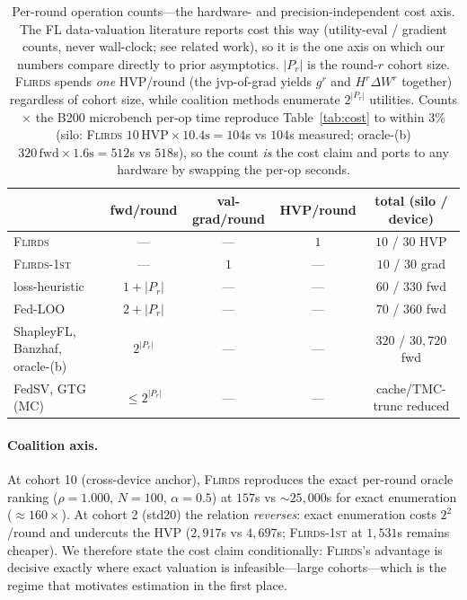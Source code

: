 \begin{table}[t]
\centering
\caption{Per-round operation counts---the hardware- and precision-independent cost
axis. The FL data-valuation literature reports cost this way (utility-eval /
gradient counts, never wall-clock; see related work), so it is the one axis on
which our numbers compare directly to prior asymptotics. $|P_r|$ is the round-$r$
cohort size. \textsc{Flirds} spends \emph{one} HVP/round (the jvp-of-grad yields
$g^r$ and $H^r\Delta W^r$ together) regardless of cohort size, while coalition
methods enumerate $2^{|P_r|}$ utilities. Counts $\times$ the B200 microbench per-op
time reproduce Table~\ref{tab:cost} to within $3\%$ (silo: \textsc{Flirds}
$10\,\mathrm{HVP}\times10.4\mathrm{s}=104$s vs $104$s measured; oracle-(b)
$320\,\mathrm{fwd}\times1.6\mathrm{s}=512$s vs $518$s), so the count \emph{is} the
cost claim and ports to any hardware by swapping the per-op seconds.
\protect{}}
\label{tab:opcount}
\small
\begin{tabular}{lcccc}
\toprule
 & fwd/round & val-grad/round & HVP/round & total (silo / device) \\
\midrule
\textsc{Flirds}       & ---          & ---   & $1$   & $10$ / $30$ HVP \\
\textsc{Flirds-1st}   & ---          & $1$   & ---   & $10$ / $30$ grad \\
loss-heuristic        & $1{+}|P_r|$  & ---   & ---   & $60$ / $330$ fwd \\
Fed-LOO               & $2{+}|P_r|$  & ---   & ---   & $70$ / $360$ fwd \\
ShapleyFL, Banzhaf, oracle-(b) & $2^{|P_r|}$ & --- & --- & $320$ / $30{,}720$ fwd \\
FedSV, GTG (MC)       & $\le 2^{|P_r|}$ & --- & ---  & cache/TMC-trunc reduced \\
\bottomrule
\end{tabular}
\end{table}

\paragraph{Coalition axis.}
At cohort 10 (cross-device anchor), \textsc{Flirds} reproduces the exact
per-round oracle ranking ($\rho = 1.000$, $N{=}100$, $\alpha{=}0.5$) at
$157$s vs $\sim$$25{,}000$s for exact enumeration ($\approx 160\times$). At
cohort 2 (std20) the relation \emph{reverses}: exact enumeration costs
$2^2$/round and undercuts the HVP ($2{,}917$s vs $4{,}697$s;
\textsc{Flirds-1st} at $1{,}531$s remains cheaper). We therefore state the cost
claim conditionally: \textsc{Flirds}'s advantage is decisive exactly where
exact valuation is infeasible---large cohorts---which is the regime that
motivates estimation in the first place.

